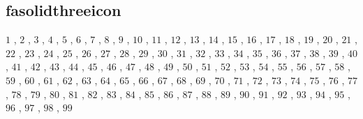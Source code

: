 \subsection{fasolidthreeicon}

$1$ , $2$ , $3$ , $4$ , $5$ , $6$ , $7$ , $8$ , $9$ , $10$ , $11$ , $12$ , $13$ , $14$ , $15$ , $16$ , $17$ , $18$ , $19$ , $20$ , $21$ , $22$ , $23$ , $24$ , $25$ , $26$ , $27$ , $28$ , $29$ , $30$ , $31$ , $32$ , $33$ , $34$ , $35$ , $36$ , $37$ , $38$ , $39$ , $40$ , $41$ , $42$ , $43$ , $44$ , $45$ , $46$ , $47$ , $48$ , $49$ , $50$ , $51$ , $52$ , $53$ , $54$ , $55$ , $56$ , $57$ , $58$ , $59$ , $60$ , $61$ , $62$ , $63$ , $64$ , $65$ , $66$ , $67$ , $68$ , $69$ , $70$ , $71$ , $72$ , $73$ , $74$ , $75$ , $76$ , $77$ , $78$ , $79$ , $80$ , $81$ , $82$ , $83$ , $84$ , $85$ , $86$ , $87$ , $88$ , $89$ , $90$ , $91$ , $92$ , $93$ , $94$ , $95$ , $96$ , $97$ , $98$ , $99$ 

\vfill\eject
